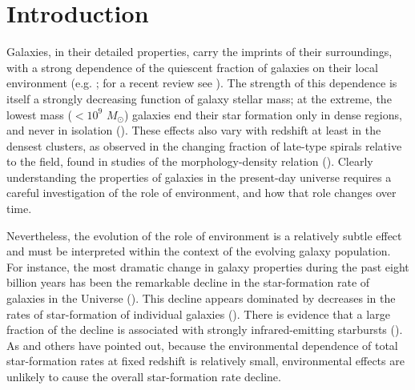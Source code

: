 \section{Introduction}
Galaxies, in their detailed properties, carry the imprints of their surroundings, with a strong dependence of the quiescent fraction of galaxies on their local environment (e.g. \citealt{hubble36a, oemler74a, dressler80a, hermit96a, guzzo97a}; for a recent review see \citealt{blanton09a}).  The strength of this dependence is itself a strongly decreasing function of galaxy stellar mass; at the extreme, the lowest mass ($<10^{9}$ $M_\odot$) galaxies end their star formation only in dense regions, and never in isolation (\citealt{geha12a}). These effects also vary with redshift at least in the densest clusters, as observed in the changing fraction of late-type spirals relative to the field, found in studies of the morphology-density relation (\citealt{dressler84a, Fasano:2000aa, Smith:2005aa, desai07a}). Clearly understanding the properties of galaxies in the present-day universe requires a careful investigation of the role of environment, and how that role changes over time.


Nevertheless, the evolution of the role of environment is a relatively subtle effect and must be interpreted within the context of the evolving galaxy population. For instance, the most dramatic change in galaxy properties during the past eight billion years has been the remarkable decline in the star-formation rate of galaxies in the Universe (\citealt{hopkins06a}). This decline appears dominated by decreases in the rates of star-formation of individual galaxies (\citealt{Noeske:2007aa}). There is evidence that a large fraction of the decline is associated with strongly infrared-emitting starbursts (\citealt{bell05a, magnelli09a}). As \cite{cooper08a} and others have pointed out, because the environmental dependence of total star-formation rates at fixed redshift is relatively small, environmental effects are unlikely to cause the overall star-formation rate decline.

